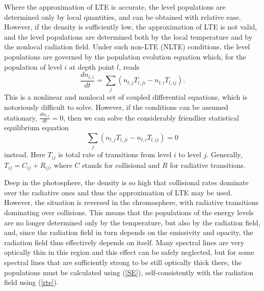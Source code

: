 \documentclass[referee]{aa}
\begin{document}
Where the approximation of LTE is accurate, the level populations are determined only by local quantities, and can be obtained with relative ease. However, if the density is sufficiently low, the approximation of LTE is not valid, and the level populations are determined both by the local temperature and by the nonlocal radiation field. Under such  non-LTE (NLTE) conditions, the level populations are governed by the population evolution equation which, for the population of level $i$ at depth point $l$, reads
\begin{equation}
 \frac{d n_{l,i}}{d t} = \sum_j (n_{l,j} T_{l,ji} - n_{l,i} T_{l,ij}).
\end{equation}
This is a nonlinear and nonlocal set of coupled differential equations, which is notoriously difficult to solve. However, if the conditions can be assumed stationary, $\frac{d n_{l,i}}{d t} = 0$, then we can solve the considerably friendlier statistical equilibrium equation
\begin{equation}
 \sum_j (n_{l,j} T_{l,ji} - n_{l,i} T_{l,ij}) = 0
 \label{SE}
\end{equation}
instead. Here $T_{ij}$ is total rate of transitions from level $i$ to level $j$. Generally, $T_{ij} = C_{ij} + R_{ij}$, where $C$ stands for collisional and $R$ for radiative transitions.

Deep in the photosphere, the density is so high that collisional rates dominate over the radiative ones and thus the approximation of LTE may be used. However, the situation is reversed in the chromosphere, with radiative transitions dominating over collisions. This means that the populations of the energy levels are no longer determined only by the temperature, but also by the radiation field, and, since the radiation field in turn depends on the emissivity and opacity, the radiation field thus effectively depends on itself. Many spectral lines are very optically thin in this region and this effect can be safely neglected, but for some spectral lines that are sufficiently strong to be still optically thick there, the populations must be calculated using (\ref{SE}), self-consistently with the radiation field using (\ref{rte}). 
\end{document}
